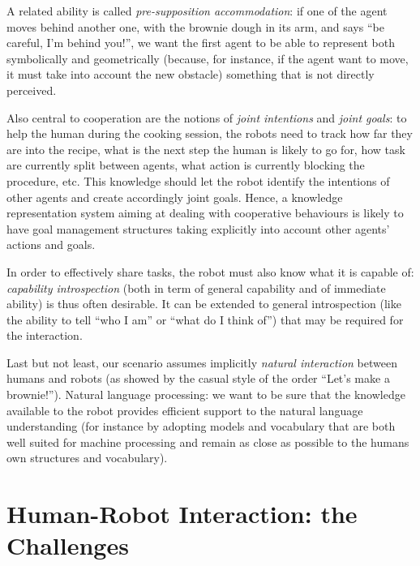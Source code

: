 A related ability is called \emph{pre-supposition accommodation}: if one of the
agent moves behind another one, with the brownie dough in its arm, and says
``be careful, I'm behind you!'', we want the first agent to be able to
represent both symbolically and geometrically (because, for instance, if the
agent want to move, it must take into account the new obstacle) something that
is not directly perceived.

Also central to cooperation are the notions of \emph{joint intentions} and
\emph{joint goals}: to help the human during the cooking session, the robots
need to track how far they are into the recipe, what is the next step the human
is likely to go for, how task are currently split between agents, what action
is currently blocking the procedure, etc. This knowledge should let the robot
identify the intentions of other agents and create accordingly joint goals.
Hence, a knowledge representation system aiming at dealing with cooperative
behaviours is likely to have goal management structures taking explicitly into
account other agents' actions and goals.

In order to effectively share tasks, the robot must also know what it is
capable of: \emph{capability introspection} (both in term of general capability
and of immediate ability) is thus often desirable. It can be extended to
general introspection (like the ability to tell ``who I am'' or ``what do I
think of'') that may be required for the interaction.

Last but not least, our scenario assumes implicitly \emph{natural interaction}
between humans and robots (as showed by the casual style of the order ``Let's
make a brownie!''). Natural language processing: we want to be sure that the
knowledge available to the robot provides efficient support to the natural
language understanding (for instance by adopting models and vocabulary that are
both well suited for machine processing and remain as close as possible to the
humans own structures and vocabulary).


\section{Human-Robot Interaction: the Challenges}
\label{sect|challenges}

